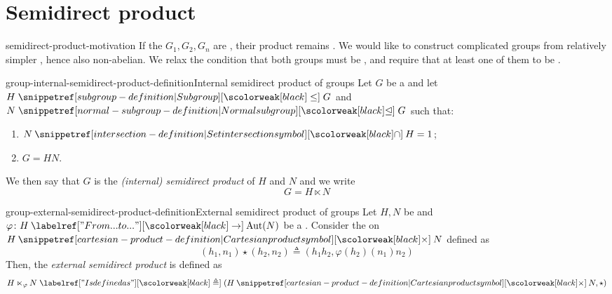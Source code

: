 \documentclass[preview]{standalone}
\begin{document}
\genpage

\section{Semidirect product}

\begin{snippet}{semidirect-product-motivation}
    If the \group[groups] \(G_1, G_2, G_n\)
    are \abeliangroup[abelian], their product remains \abeliangroup[abelian].
    We would like to construct complicated groups from relatively simpler \group[groups],
    hence also non-abelian.
    We relax the condition that both groups must be \normalsubgrptext, and require that
    at least one of them to be \normalsubgrptext.
\end{snippet}

%
%

\begin{snippetdefinition}{group-internal-semidirect-product-definition}{Internal semidirect product of groups}
    Let \(G\) be a \group and let \(H \subgroupleq G\)
    and \(N \normalsubgrp G\) such that:
    \begin{enumerate}
        \item \(N \intersection H = 1\);
        \item \(G = HN\).
    \end{enumerate}
    We then say that \(G\) is the \emph{(internal) semidirect product}
    of \(H\) and \(N\) and we write
    \[
        G = H \ltimes N
    \]
\end{snippetdefinition}

\begin{snippetdefinition}{group-external-semidirect-product-definition}{External semidirect product of groups}
    Let \(H,N\) be \group[groups] and \(\varphi \colon H \fromto \text{Aut}(N)\)
    be a \grouphomomorphism.
    Consider the \binoperation on \(H \cartesianprod N\) defined as
    \[
        (h_1, n_1) \star (h_2, n_2)
        \triangleq
        (h_1h_2, \varphi(h_2)(n_1)n_2)
    \]
    Then, the \emph{external semidirect product} is defined as
    \[
        H \ltimes_\varphi N \triangleq (H \cartesianprod N, \star)
    \]
\end{snippetdefinition}
\end{document}

